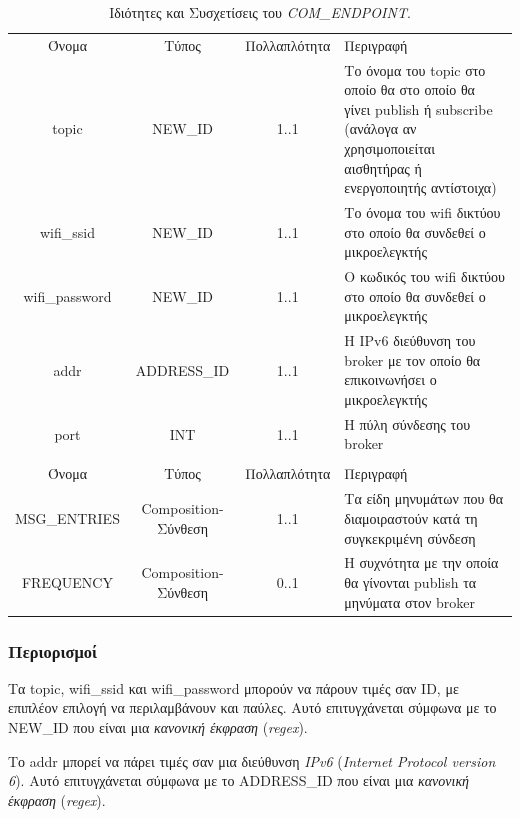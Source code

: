 \begin{table}[H]
	\begin{center}
		\begin{tabular}{ | c | c | c| m{5.5cm} | }
			\hline
			\rowcolor{Gray}
			\multicolumn{4}{|c|}{\textbf{Ιδιότητες}}\\
			\hline
			\rowcolor{Gray}
			Όνομα & Τύπος & Πολλαπλότητα & Περιγραφή \\
			\hline
			topic & NEW\_ID & 1..1 & Το όνομα του topic στο οποίο θα στο οποίο θα γίνει publish ή subscribe (ανάλογα αν χρησιμοποιείται αισθητήρας ή ενεργοποιητής αντίστοιχα) \\
			\hline
			wifi\_ssid & NEW\_ID & 1..1 & Το όνομα του wifi δικτύου στο οποίο θα συνδεθεί ο μικροελεγκτής \\
			\hline
			wifi\_password & NEW\_ID & 1..1 & Ο κωδικός του wifi δικτύου στο οποίο θα συνδεθεί ο μικροελεγκτής \\
			\hline
			addr & ADDRESS\_ID & 1..1 & Η IPv6 διεύθυνση του broker με τον οποίο θα επικοινωνήσει ο μικροελεγκτής \\
			\hline
			port & INT & 1..1 & Η πύλη σύνδεσης του broker \\
			\hline
			\rowcolor{Gray}
			\multicolumn{4}{|c|}{\textbf{Συσχετίσεις}}\\
			\hline
			\rowcolor{Gray}
			Όνομα & Τύπος & Πολλαπλότητα & Περιγραφή \\
			\hline
			MSG\_ENTRIES & Composition-Σύνθεση & 1..1 &  Τα είδη μηνυμάτων που θα διαμοιραστούν κατά τη συγκεκριμένη σύνδεση \\
			\hline
			FREQUENCY & Composition-Σύνθεση & 0..1 &  Η συχνότητα με την οποία θα γίνονται publish τα μηνύματα στον broker \\
			\hline
		\end{tabular}
		\caption{Ιδιότητες και Συσχετίσεις του \textit{COM\_ENDPOINT}.}
		\label{tab:com_endpoint}
	\end{center}
\end{table}

\subsubsection*{Περιορισμοί}

\noindent Τα topic, wifi\_ssid και wifi\_password μπορούν να πάρουν τιμές σαν ID, με επιπλέον επιλογή να περιλαμβάνουν και παύλες. Αυτό επιτυγχάνεται σύμφωνα με το NEW\_ID που είναι μια \textit{κανονική έκφραση} (\textit{regex}).

\noindent Το addr μπορεί να πάρει τιμές σαν μια διεύθυνση \textit{IPv6} (\textit{Internet Protocol version 6}). Αυτό επιτυγχάνεται σύμφωνα με το ADDRESS\_ID που είναι μια \textit{κανονική έκφραση} (\textit{regex}).

